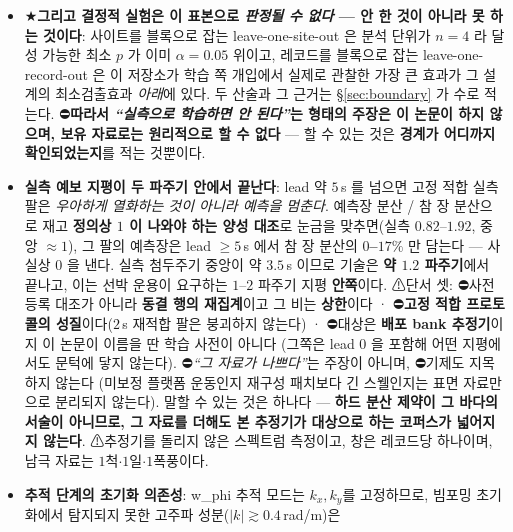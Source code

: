 \documentclass[11pt]{report}
\numberwithin{equation}{chapter}
\numberwithin{figure}{chapter}
\numberwithin{table}{chapter}
\begin{document}
\begin{itemize}
  \item ★\textbf{그리고 결정적 실험은 이 표본으로 \emph{판정될 수 없다} --- 안 한 것이
        아니라 못 하는 것이다}: 사이트를 블록으로 잡는 leave-one-site-out 은 분석 단위가
        $n = 4$ 라 달성 가능한 최소 $p$ 가 이미 $\alpha = 0.05$ 위이고, 레코드를 블록으로
        잡는 leave-one-record-out 은 이 저장소가 학습 쪽 개입에서 실제로 관찰한 가장 큰
        효과가 그 설계의 최소검출효과 \emph{아래}에 있다. 두 산술과 그 근거는
        \S\ref{sec:boundary} 가 수로 적는다. ⛔\textbf{따라서 \emph{``실측으로 학습하면
        안 된다''}는 형태의 주장은 이 논문이 하지 않으며, 보유 자료로는 원리적으로 할 수
        없다} --- 할 수 있는 것은 \textbf{경계가 어디까지 확인되었는지}를 적는 것뿐이다.
  \item \textbf{실측 예보 지평이 두 파주기 안에서 끝난다}: lead 약 $5$\,s 를 넘으면
        고정 적합 실측 팔은 \emph{우아하게 열화하는 것이 아니라 예측을 멈춘다}.
        예측장 분산 / 참 장 분산으로 재고 \textbf{정의상 $1$ 이 나와야 하는 양성 대조}로
        눈금을 맞추면(실측 $0.82$--$1.92$, 중앙 $\approx 1$), 그 팔의 예측장은
        lead $\ge 5$\,s 에서 참 장 분산의 \textbf{$0$--$17\%$} 만 담는다 --- 사실상 $0$ 을 낸다.
        실측 첨두주기 중앙이 약 $3.5$\,s 이므로 기술은 \textbf{약 $1.2$ 파주기}에서 끝나고,
        이는 선박 운용이 요구하는 $1$--$2$ 파주기 지평 \textbf{안쪽}이다.
        ⚠단서 셋: ⛔사전등록 대조가 아니라 \textbf{동결 행의 재집계}이고 그 비는 \textbf{상한}이다 ·
        ⛔\textbf{고정 적합 프로토콜의 성질}이다($2$\,s 재적합 팔은 붕괴하지 않는다) ·
        ⛔대상은 \textbf{배포 bank 추정기}이지 이 논문이 이름을 딴 학습 사전이 아니다
        (그쪽은 lead $0$ 을 포함해 어떤 지평에서도 문턱에 닿지 않는다).
        ⛔\emph{``그 자료가 나쁘다''}는 주장이 아니며, ⛔기제도 지목하지 않는다
        (미보정 플랫폼 운동인지 재구성 패치보다 긴 스웰인지는 표면 자료만으로
        분리되지 않는다). 말할 수 있는 것은 하나다 --- \textbf{하드 분산 제약이 그
        바다의 서술이 아니므로, 그 자료를 더해도 본 추정기가 대상으로 하는 코퍼스가
        넓어지지 않는다}. ⚠추정기를 돌리지 않은 스펙트럼 측정이고, 창은 레코드당
        하나이며, 남극 자료는 $1$척$\cdot$$1$일$\cdot$$1$폭풍이다.
  \item \textbf{추적 단계의 초기화 의존성}: w\_phi 추적 모드는 $k_x, k_y$를 고정하므로,
        빔포밍 초기화에서 탐지되지 못한 고주파 성분($|k| \gtrsim 0.4$\,rad/m)은

\end{itemize}
\end{document}
